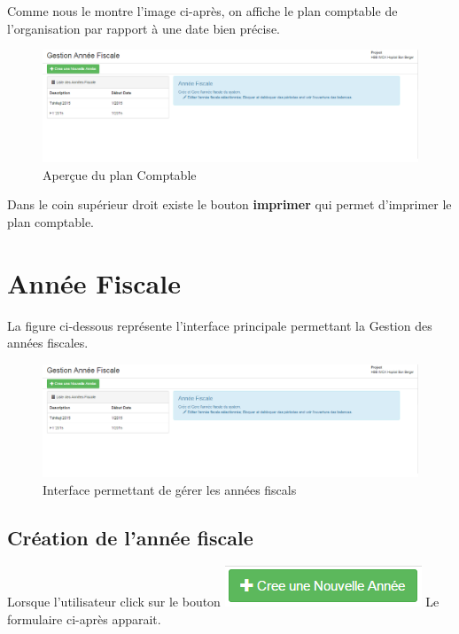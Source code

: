\documentclass[12pt,a4paper]{report}
\begin{document}
Comme nous le montre l'image ci-après, on affiche le plan comptable de l'organisation par rapport à une date bien précise.\\
\newpage
\begin{figure}[h]
\begin{center}
\includegraphics[width=14cm]{pic/AnneeFiscal.png}
\end{center}
\caption{Aperçue du plan Comptable}
\label{Aperçue du plan Comptable}
\end{figure}

Dans le coin supérieur droit existe le bouton \textbf{imprimer} qui permet d'imprimer le plan comptable.
\section{Année Fiscale}
La figure ci-dessous représente l'interface principale permettant la Gestion des années fiscales. 
\begin{figure}[h]
\begin{center}
\includegraphics[width=14cm]{pic/AnneeFiscal.png}
\end{center}
\caption{Interface permettant de gérer les années fiscals}
\label{Interface permettant de gérer les années fiscals}
\end{figure}

\newpage
\subsection{Création de l'année fiscale}
Lorsque l'utilisateur click sur le bouton \includegraphics[scale=0.7]{pic/CreeAnnFisc.png} Le formulaire ci-après apparait.
\end{document}
